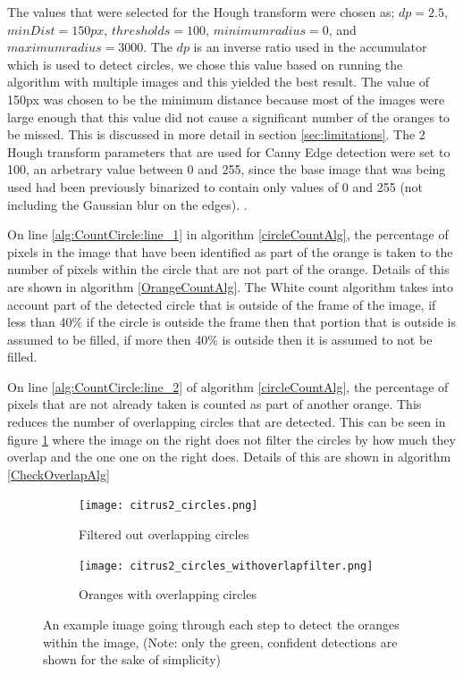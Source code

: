 \documentclass[conference]{IEEEtran}
\begin{document}
The values that were selected for the Hough transform were chosen as; $dp = 2.5$, $minDist = 150px$, $thresholds = 100$, $minimum radius = 0$, and  $maximum radius = 3000$. The $dp$ is an inverse ratio used in the accumulator which is used to detect circles, we chose this value based on running the algorithm with multiple images and this yielded the best result. The value of 150px was chosen to be the minimum distance because most of the images were large enough that this value did not cause a significant number of the oranges to be missed. This is discussed in more detail in section \ref{sec:limitations}. The 2 Hough transform parameters that are used for Canny Edge detection were set to 100, an arbetrary value between 0 and 255, since the base image that was being used had been previously binarized to contain only values of 0 and 255 (not including the Gaussian blur on the edges). \cite{yadav_approach_2014}.


On line \ref{alg:CountCircle:line_1} in algorithm \ref{circleCountAlg}, the percentage of pixels in the image that have been identified as part of the orange is taken to the number of pixels within the circle that are not part of the orange. Details of this are shown in algorithm \ref{OrangeCountAlg}. The White count algorithm takes into account part of the detected circle that is outside of the frame of the image, if less than 40\% if the circle is outside the frame then that portion that is outside is assumed to be filled, if more then 40\% is outside then it is assumed to not be filled. 


On line \ref{alg:CountCircle:line_2} of algorithm \ref{circleCountAlg}, the percentage of pixels that are not already taken is counted as part of another orange. This reduces the number of overlapping circles that are detected. This can be seen in figure \ref{overlapComp} where the image on the right does not filter the circles by how much they overlap and the one one on the right does. Details of this are shown in algorithm \ref{CheckOverlapAlg}


\begin{figure}[H]
  \begin{subfigure}{.49\linewidth}
 	 \texttt{[image: citrus2\_circles.png]}\hfill
	 \caption{Filtered out overlapping circles}
  \end{subfigure}
  \begin{subfigure}{.49\linewidth}
  	\texttt{[image: citrus2\_circles\_withoverlapfilter.png]}
   	\caption{Oranges with overlapping circles}
  \end{subfigure}
  \caption{An example image going through each step to detect the oranges within the image, (Note: only the green, confident detections are shown for the sake of simplicity)} \label{overlapComp}
\end{figure}
\end{document}
